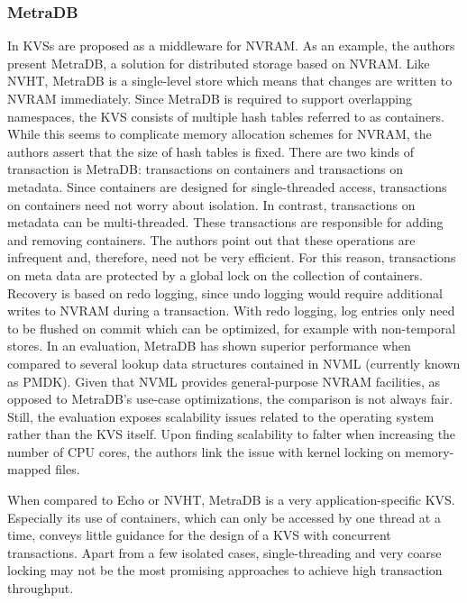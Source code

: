 \subsubsection{MetraDB}

In \cite{marmol2016nonvolatile} \acp{KVS} are proposed as a middleware for
\ac{NVRAM}. As an example, the authors present MetraDB, a solution for
distributed storage based on \ac{NVRAM}. Like NVHT, MetraDB is a single-level
store which means that changes are written to \ac{NVRAM} immediately. Since
MetraDB is required to support overlapping namespaces, the \ac{KVS} consists of
multiple hash tables referred to as containers. While this seems to complicate
memory allocation schemes for \ac{NVRAM}, the authors assert that the size of
hash tables is fixed. There are two kinds of transaction is MetraDB:
transactions on containers and transactions on metadata. Since containers are
designed for single-threaded access, transactions on containers need not worry
about isolation. In contrast, transactions on metadata can be multi-threaded.
These transactions are responsible for adding and removing containers. The
authors point out that these operations are infrequent and, therefore, need not
be very efficient. For this reason, transactions on meta data are protected by a
global lock on the collection of containers. Recovery is based on redo logging,
since undo logging would require additional writes to \ac{NVRAM} during a
transaction. With redo logging, log entries only need to be flushed on commit
which can be optimized, for example with non-temporal stores. In an evaluation,
MetraDB has shown superior performance when compared to several lookup data
structures contained in NVML (currently known as PMDK). Given that NVML provides
general-purpose \ac{NVRAM} facilities, as opposed to MetraDB's use-case
optimizations, the comparison is not always fair. Still, the evaluation exposes
scalability issues related to the operating system rather than the \ac{KVS}
itself. Upon finding scalability to falter when increasing the number of
\ac{CPU} cores, the authors link the issue with kernel locking on memory-mapped
files.

When compared to Echo or NVHT, MetraDB is a very application-specific \ac{KVS}.
Especially its use of containers, which can only be accessed by one thread at a
time, conveys little guidance for the design of a \ac{KVS} with concurrent
transactions. Apart from a few isolated cases, single-threading and very coarse
locking may not be the most promising approaches to achieve high transaction
throughput.
